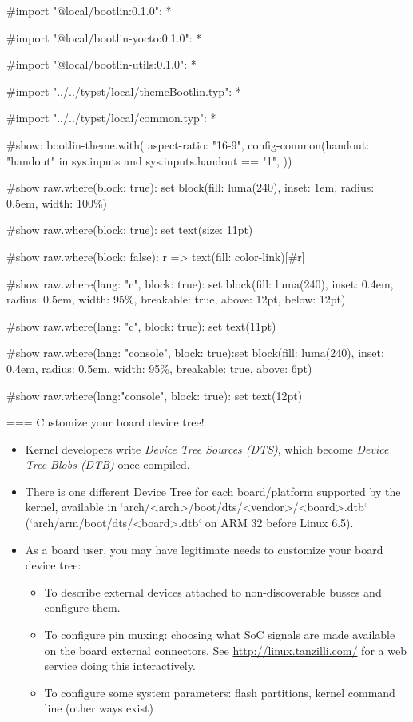 #import "@local/bootlin:0.1.0": *

#import "@local/bootlin-yocto:0.1.0": *

#import "@local/bootlin-utils:0.1.0": *

#import "../../typst/local/themeBootlin.typ": *

#import "../../typst/local/common.typ": *

#show: bootlin-theme.with( aspect-ratio: "16-9", config-common(handout: "handout" in sys.inputs and sys.inputs.handout == "1", ))

#show raw.where(block: true): set block(fill: luma(240), inset: 1em, radius: 0.5em, width: 100\%)

#show raw.where(block: true): set text(size: 11pt)

#show raw.where(block: false): r => text(fill: color-link)[#r]

#show raw.where(lang: "c", block: true): set block(fill: luma(240), inset: 0.4em, radius: 0.5em, width: 95\%, breakable: true, above: 12pt, below: 12pt)

#show raw.where(lang: "c", block: true): set text(11pt)

#show raw.where(lang: "console", block: true):set block(fill: luma(240), inset: 0.4em, radius: 0.5em, width: 95\%, breakable: true, above: 6pt)

#show raw.where(lang:"console", block: true): set text(12pt)

=== Customize your board device tree!
  \begin{itemize}
  \item Kernel developers write {\em Device Tree Sources (DTS)},
    which become {\em Device Tree Blobs (DTB)} once compiled.
  \item There is one different Device Tree for each board/platform
    supported by the kernel, available in
    `arch/<arch>/boot/dts/<vendor>/<board>.dtb`
    (`arch/arm/boot/dts/<board>.dtb` on ARM 32 before Linux 6.5).
  \item As a board user, you may have legitimate needs to customize
    your board device tree:
    \begin{itemize}
    \item To describe external devices attached to non-discoverable
      busses and configure them.
    \item To configure pin muxing: choosing what SoC signals are
      made available on the board external connectors.
      See \url{http://linux.tanzilli.com/} for a web service doing this
      interactively.
    \item To configure some system parameters: flash partitions,
      kernel command line (other ways exist)
    \end{itemize}
  \end{itemize}

